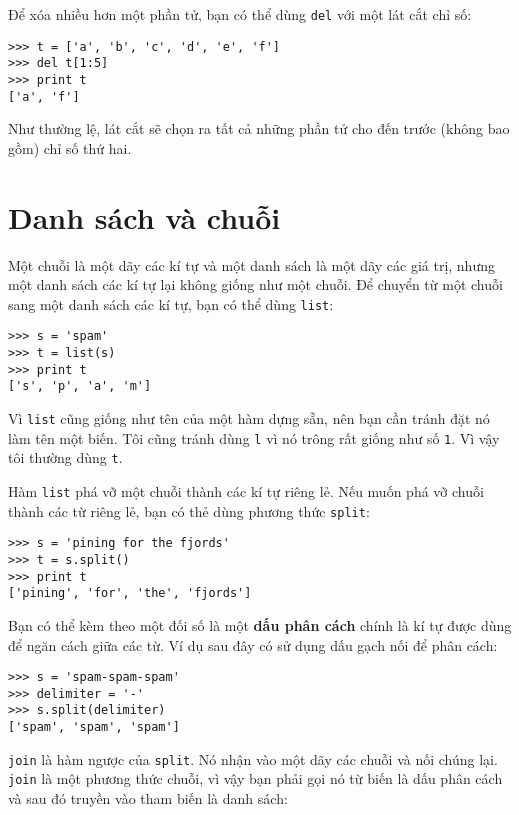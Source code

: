 \documentclass[11pt]{book}
\begin{document}

Để xóa nhiều hơn một phần tử, bạn có thể dùng {\tt del} với
một lát cắt chỉ số:

\beforeverb
\begin{verbatim}
>>> t = ['a', 'b', 'c', 'd', 'e', 'f']
>>> del t[1:5]
>>> print t
['a', 'f']
\end{verbatim}
\afterverb
%
Như thường lệ, lát cắt sẽ chọn ra tất cả những phần tử cho đến
trước (không bao gồm) chỉ số thứ hai.


\section{Danh sách và chuỗi}


Một chuỗi là một dãy các kí tự và một danh sách là một dãy các
giá trị, nhưng một danh sách các kí tự lại không giống như một
chuỗi. Để chuyển từ một chuỗi sang một danh sách các kí tự, bạn
có thể dùng {\tt list}:


\beforeverb
\begin{verbatim}
>>> s = 'spam'
>>> t = list(s)
>>> print t
['s', 'p', 'a', 'm']
\end{verbatim}
\afterverb
%
Vì {\tt list} cũng giống như tên của một hàm dựng sẵn, nên bạn
cần tránh đặt nó làm tên một biến. Tôi cũng tránh dùng {\tt l} vì
nó trông rất giống như số {\tt 1}.  Vì vậy tôi thường dùng {\tt t}.

Hàm {\tt list} phá vỡ một chuỗi thành các kí tự riêng lẻ. Nếu muốn
phá vỡ chuỗi thành các từ riêng lẻ, bạn có thẻ dùng phương thức {\tt split}:


\beforeverb
\begin{verbatim}
>>> s = 'pining for the fjords'
>>> t = s.split()
>>> print t
['pining', 'for', 'the', 'fjords']
\end{verbatim}
\afterverb
%
Bạn có thể kèm theo một đối số là một {\bf dấu phân cách}
chính là kí tự được dùng để ngăn cách giữa các từ.
Ví dụ sau đây có sử dụng dấu gạch nối để phân cách:


\beforeverb
\begin{verbatim}
>>> s = 'spam-spam-spam'
>>> delimiter = '-'
>>> s.split(delimiter)
['spam', 'spam', 'spam']
\end{verbatim}
\afterverb
%
{\tt join} là hàm ngược của {\tt split}.  Nó
nhận vào một dãy các chuỗi và
nối chúng lại. {\tt join} là một phương thức chuỗi,
vì vậy bạn phải gọi nó từ biến là dấu phân cách và
sau đó truyền vào tham biến là danh sách:
\end{document}
